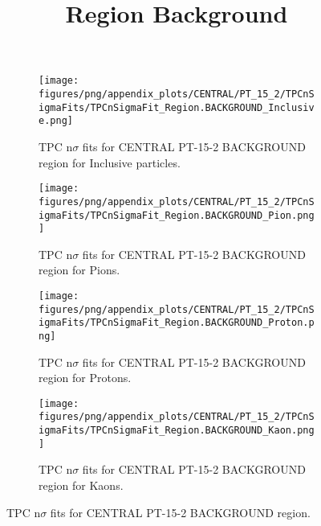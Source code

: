             \begin{figure}[H]
                \title{Region Background}
                \begin{subfigure}[b]{0.5\textwidth}
                    \centering
                    \texttt{[image: figures/png/appendix\_plots/CENTRAL/PT\_15\_2/TPCnSigmaFits/TPCnSigmaFit\_Region.BACKGROUND\_Inclusive.png]}
                    \caption{TPC n$\sigma$ fits for CENTRAL PT-15-2 BACKGROUND region for Inclusive particles.}
                    \label{fig:appendix_CENTRAL_PT-15-2_BACKGROUND_Inclusive}
                \end{subfigure}
                \begin{subfigure}[b]{0.5\textwidth}
                    \centering
                    \texttt{[image: figures/png/appendix\_plots/CENTRAL/PT\_15\_2/TPCnSigmaFits/TPCnSigmaFit\_Region.BACKGROUND\_Pion.png]}
                    \caption{TPC n$\sigma$ fits for CENTRAL PT-15-2 BACKGROUND region for Pions.}
                    \label{fig:appendix_CENTRAL_PT-15-2_BACKGROUND_Pion}
                \end{subfigure}
                \begin{subfigure}[b]{0.5\textwidth}
                    \centering
                    \texttt{[image: figures/png/appendix\_plots/CENTRAL/PT\_15\_2/TPCnSigmaFits/TPCnSigmaFit\_Region.BACKGROUND\_Proton.png]}
                    \caption{TPC n$\sigma$ fits for CENTRAL PT-15-2 BACKGROUND region for Protons.}
                    \label{fig:appendix_CENTRAL_PT-15-2_BACKGROUND_Proton}
                \end{subfigure}
                \begin{subfigure}[b]{0.5\textwidth}
                    \centering
                    \texttt{[image: figures/png/appendix\_plots/CENTRAL/PT\_15\_2/TPCnSigmaFits/TPCnSigmaFit\_Region.BACKGROUND\_Kaon.png]}
                    \caption{TPC n$\sigma$ fits for CENTRAL PT-15-2 BACKGROUND region for Kaons.}
                    \label{fig:appendix_CENTRAL_PT-15-2_BACKGROUND_Kaon}
                \end{subfigure}
                \caption{TPC n$\sigma$ fits for CENTRAL PT-15-2 BACKGROUND region.}
                \label{fig:appendix_CENTRAL_PT-15-2_BACKGROUND}
            \end{figure}
            \clearpage
            
    
